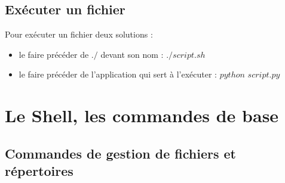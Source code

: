 \documentclass[a4paper,10pt]{article}
\begin{document}
\subsection{Exécuter un fichier}
Pour exécuter un fichier deux solutions :
\begin{itemize}
	\item le faire précéder de $./$ devant son nom : $./script.sh$
	\item le faire précéder de l'application qui sert à l'exécuter : $python$  $script.py$
\end{itemize}
\section{Le Shell, les commandes de base}

\subsection{Commandes de gestion de fichiers et répertoires}
\setlength{\parindent}{0ex}
\end{document}
